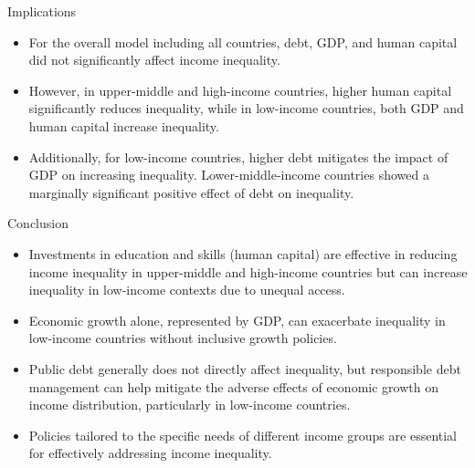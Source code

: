 \documentclass[10pt]{beamer}
\begin{document}
\begin{frame}{Implications}

\begin{itemize}
\item For the overall model including all countries, debt, GDP, and human capital did not significantly affect income inequality. 
\item However, in upper-middle and high-income countries, higher human capital significantly reduces inequality, while in low-income countries, both GDP and human capital increase inequality. 
\item Additionally, for low-income countries, higher debt mitigates the impact of GDP on increasing inequality. Lower-middle-income countries showed a marginally significant positive effect of debt on inequality.	
	
\end{itemize}

\end{frame}


\begin{frame}{Conclusion}
	

\begin{itemize}
	
\item	Investments in education and skills (human capital) are effective in reducing income inequality in upper-middle and high-income countries but can increase inequality in low-income contexts due to unequal access. 
	
	
\item 	Economic growth alone, represented by GDP, can exacerbate inequality in low-income countries without inclusive growth policies.
	
\item	Public debt generally does not directly affect inequality, but responsible debt management can help mitigate the adverse effects of economic growth on income distribution, particularly in low-income countries. 
	
\item 	Policies tailored to the specific needs of different income groups are essential for effectively addressing income inequality.

\end{itemize}

\end{frame}
\end{document}
